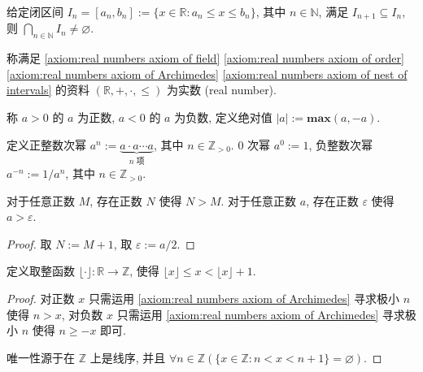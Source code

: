\begin{axiom}[区间套公理]
    \label {axiom:real numbers axiom of nest of intervals}
    给定闭区间 \(I_n = [a_n, b_n] := \{x \in \mathbb{R} : a_n \le x \le b_n\}\), 其中 \(n \in \mathbb{N}\), 满足
    \(I_{n + 1} \subseteq I_n\), 则 \(\bigcap_{n \in \mathbb{N}} I_n \neq \varnothing\).
\end{axiom}

称满足 \ref{axiom:real numbers axiom of field} \ref{axiom:real numbers axiom of order} \ref{axiom:real numbers axiom of Archimedes} \ref{axiom:real numbers axiom of nest of intervals} 的资料 \((\mathbb{R},+,\cdot,\le)\) 为实数 (real number).

\begin{definition}
    称 \(a > 0\) 的 \(a\) 为正数, \(a < 0\) 的 \(a\) 为负数, 定义绝对值 \(|a| := \mathbf{max} (a, -a)\).
\end{definition}

\begin{definition}
    定义正整数次幂 \(a^n := \underbrace{a \cdot a \cdots a}_{n \text{ 项}}\), 其中 \(n \in \mathbb{Z}_{>0}\).
    \(0\) 次幂 \(a^0 := 1\), 负整数次幂 \(a^{-n} := 1 / a^n\), 其中 \(n \in \mathbb{Z}_{>0}\).
\end{definition}

\begin{lemma}
    对于任意正数 \(M\), 存在正数 \(N\) 使得 \(N > M\).
    对于任意正数 \(a\), 存在正数 \(\varepsilon\) 使得 \(a > \varepsilon\).

    \begin{proof}
        取 \(N := M + 1\), 取 \(\varepsilon := a / 2\).
    \end{proof}
\end{lemma}

\begin{definition}
    定义取整函数 \(\lfloor \cdot \rfloor : \mathbb{R} \to \mathbb{Z}\), 使得 \(\lfloor x \rfloor \le x < \lfloor x \rfloor + 1\).

    \begin{proof}
        对正数 \(x\) 只需运用 \ref{axiom:real numbers axiom of Archimedes} 寻求极小 \(n\) 使得 \(n > x\),
        对负数 \(x\) 只需运用 \ref{axiom:real numbers axiom of Archimedes} 寻求极小 \(n\) 使得 \(n \ge -x\) 即可.

        唯一性源于在 \(\mathbb{Z}\) 上是线序, 并且 \(\forall n \in \mathbb{Z}(\{x \in \mathbb{Z} : n < x < n + 1\} = \varnothing)\).
    \end{proof}
\end{definition}


